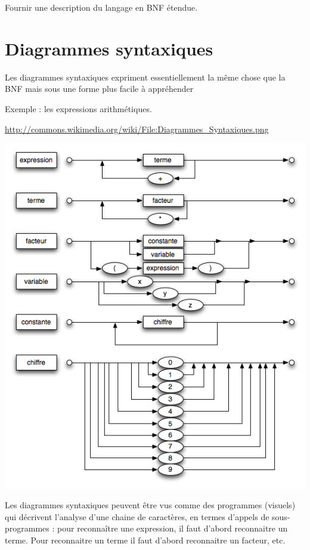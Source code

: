 {Fournir une description du langage en BNF étendue.


\section{Diagrammes syntaxiques}


Les diagrammes syntaxiques expriment essentiellement la même chose que la BNF
mais sous une forme plus facile à appréhender

Exemple : les expressions arithmétiques.

{\scriptsize

\url{http://commons.wikimedia.org/wiki/File:Diagrammes_Syntaxiques.png}
}

\begin{center}
\includegraphics[width=\linewidth]{../images/Diagrammes_Syntaxiques}
\end{center}

Les diagrammes syntaxiques peuvent être vus comme des programmes
(visuels) qui décrivent l'analyse d'une chaine de caractères, en
termes d'appels de sous-programmes : pour reconnaître une expression,
il faut d'abord reconnaitre un terme. Pour reconnaitre un terme
il faut d'abord reconnaitre un facteur, etc.

}
